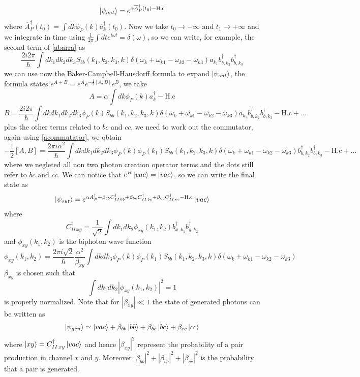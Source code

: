 \[\ket{\psi_{out}} = e^{\alpha \overline{A}_P^\dagger(t_0)-\text{H.c}}\]
where $\overline{A}_P^\dagger(t_0) = \int dk \phi_P(k)\overline{a}_k^\dagger(t_0)$. Now we take $t_0\to -\infty$ and $t_1 \to +\infty$ and we integrate in time using $\frac{1}{2\pi} \int dt e^{i\omega t} = \delta(\omega)$, so we can write, for example, the second term of \eqref{abarra} as
\[\frac{2i2\pi }{\hbar}\int dk_1dk_2 dk_3S_{bb}(k_1,k_2,k_3,k)\delta(\omega_{k}+\omega_{k1}-\omega_{k2}-\omega_{k3})a_{k_1}b_{b,k_2}^\dagger b_{b,k_3}^\dagger \]
we can use now the Baker-Campbell-Hausdorff formula to expand $\ket{\psi_{out}}$, the formula states $e^{A+B} = e^{A}e^{-\frac{1}{2}[A,B]} e^{B}$, we take 
\[A =\alpha \int dk \phi_P(k)a_k^\dagger - \text{H.c} \]
\[B = \frac{2i2\pi }{\hbar}\int dk dk_1dk_2 dk_3\phi_P(k)S_{bb}(k_1,k_2,k_3,k)\delta(\omega_{k}+\omega_{k1}-\omega_{k2}-\omega_{k3})a_{k_1}b_{b,k_2}^\dagger b_{b,k_3}^\dagger -\text{H.c} +\dots\]
plus the other terms related to $bc$ and $cc$, we need to work out the commutator, again using \eqref{acommutator}, we obtain
\[-\frac{1}{2}[A,B] = \frac{2\pi i \alpha^2}{\hbar}\int dk dk_1dk_2 dk_3\phi_P(k)\phi_P(k_1)S_{bb}(k_1,k_2,k_3,k)\delta(\omega_{k}+\omega_{k1}-\omega_{k2}-\omega_{k3})b_{b,k_2}^\dagger b_{b,k_3}^\dagger -\text{H.c} +\dots\]
where we negleted all non two photon creation operator terms and the dots still refer to $bc$ and $cc$. We can notice that $e^B\ket{vac} = \ket{vac}$, so we can write the final state as
\[\ket{\psi_{out}} = e^{\alpha A_P^\dagger + \beta_{bb} C^\dagger_{II\,bb}+ \beta_{bc} C^\dagger_{II\,bc}+ \beta_{cc} C^\dagger_{II\,cc}-\text{H.c}}\ket{vac}\]
where
\[C^\dagger_{II\, xy} = \frac{1}{\sqrt{2}}\int dk_1 dk_2 \phi_{xy}(k_1,k_2)b_{x,k_1}^\dagger b_{y,k_2}^\dagger \]
and $\phi_{xy}(k_1,k_2)$ is the biphoton wave function 
\[\phi_{xy}(k_1,k_2) = \frac{2\pi i \sqrt{2}}{\hbar} \frac{\alpha^2}{\beta_{xy}}\int dk dk_3\phi_P(k)\phi_P(k_1)S_{bb}(k_1,k_2,k_3,k)\delta(\omega_{k}+\omega_{k1}-\omega_{k2}-\omega_{k3}) \]
$\beta_{xy}$ is chosen such that
\[\int dk_1 dk_2 |\phi_{xy}(k_1,k_2)|^2 = 1\]
is properly normalized. Note that for $|\beta_{xy}| \ll 1 $ the state of generated photons can be written as
\[\ket{\psi_{gen}} \simeq \ket{vac} + \beta_{bb}\ket{bb}+ \beta_{bc}\ket{bc}+ \beta_{cc}\ket{cc} \]
where $\ket{xy} = C_{II\, xy}^\dagger\ket{vac}$ and hence $|\beta_{xy}|^2$ represent the probability of a pair production in channel $x$ and $y$. Moreover
$|\beta_{bb}|^2 + |\beta_{bc}|^2 +|\beta_{cc}|^2$ is the probability that a pair is generated.

